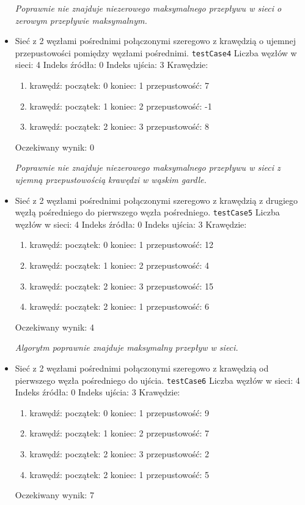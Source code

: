 \begin{itemize}[nosep]
    \emph{Poprawnie
    nie znajduje niezerowego maksymalnego przepływu
    w sieci o zerowym przepływie maksymalnym.}

    \item Sieć z 2 węzłami pośrednimi połączonymi szeregowo z krawędzią o
    ujemnej przepustowości pomiędzy węzłami pośrednimi.
    \texttt{testCase4}
    Liczba węzłów w sieci: 4
    Indeks źródła: 0
    Indeks ujścia: 3
    Krawędzie:
    \begin{enumerate}[nosep]
        \item krawędź:
        początek: 0
        koniec: 1
        przepustowość: 7
        \item krawędź:
        początek: 1
        koniec: 2
        przepustowość: -1
        \item krawędź:
        początek: 2
        koniec: 3
        przepustowość: 8
    \end{enumerate}
    Oczekiwany wynik: 0

    \emph{Poprawnie
    nie znajduje niezerowego maksymalnego przepływu
    w sieci z ujemną przepustowością krawędzi w wąskim gardle.}

    \item Sieć z 2 węzłami pośrednimi połączonymi szeregowo z krawędzią z
    drugiego węzłą pośredniego do pierwszego węzła pośredniego.
    \texttt{testCase5}
    Liczba węzłów w sieci: 4
    Indeks źródła: 0
    Indeks ujścia: 3
    Krawędzie:
    \begin{enumerate}[nosep]
        \item krawędź:
        początek: 0
        koniec: 1
        przepustowość: 12
        \item krawędź:
        początek: 1
        koniec: 2
        przepustowość: 4
        \item krawędź:
        początek: 2
        koniec: 3
        przepustowość: 15
        \item krawędź:
        początek: 2
        koniec: 1
        przepustowość: 6
    \end{enumerate}
    Oczekiwany wynik: 4

    \emph{Algorytm
    poprawnie znajduje maksymalny przepływ w sieci.}

    \item Sieć z 2 węzłami pośrednimi połączonymi szeregowo z krawędzią od
    pierwszego węzła pośredniego do ujścia.
    \texttt{testCase6}
    Liczba węzłów w sieci: 4
    Indeks źródła: 0
    Indeks ujścia: 3
    Krawędzie:
    \begin{enumerate}[nosep]
        \item krawędź:
        początek: 0
        koniec: 1
        przepustowość: 9
        \item krawędź:
        początek: 1
        koniec: 2
        przepustowość: 7
        \item krawędź:
        początek: 2
        koniec: 3
        przepustowość: 2
        \item krawędź:
        początek: 2
        koniec: 1
        przepustowość: 5
    \end{enumerate}
    Oczekiwany wynik: 7


\end{itemize}
